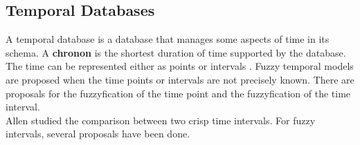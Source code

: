 %



\subsection{Temporal Databases}
A temporal database \cite{Dyreson1994} is a database that manages some aspects of time in its schema. A \textbf{chronon} is the shortest duration of time supported by the database. The time can be represented either as points or intervals \cite{655777}. Fuzzy temporal models \cite{schockaert08} are proposed when the time points or intervals are not precisely known. There are proposals for the  fuzzyfication of the time point and the fuzzyfication of the time interval.\\
Allen \cite{Allen83} studied the comparison between two crisp time intervals. For fuzzy intervals, several proposals \cite{ohlbach04,nagypal03,schockaert08} have been done.




